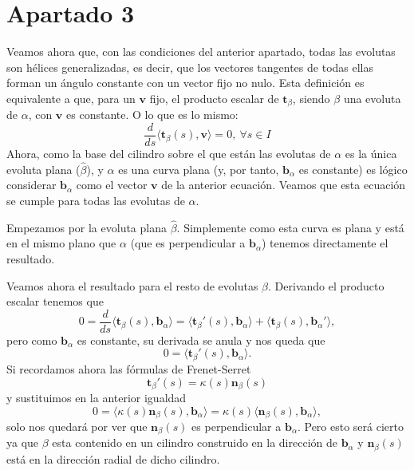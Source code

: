 \section{Apartado 3}
Veamos ahora que, con las condiciones del anterior apartado, todas las evolutas
son hélices generalizadas, es decir, que los vectores tangentes de todas ellas
forman un ángulo constante con un vector fijo no nulo. Esta definición es
equivalente a que, para un $\mathbf{v}$ fijo, el producto escalar de
$\mathbf{t}_{\beta}$, siendo $\beta$ una evoluta de $\alpha$, con $\mathbf{v}$
es constante. O lo que es lo mismo:
\[
    \frac{d}{ds}\langle \mathbf{t}_{\beta}\left( s \right), \mathbf{v} \rangle
    = 0,\ \forall s \in I
\]
Ahora, como la base del cilindro sobre el que están las evolutas de $\alpha$ es
la única evoluta plana ($\hat{\beta}$), y $\alpha$ es una curva
plana (y, por tanto, $\mathbf{b}_{\alpha}$ es constante) es lógico considerar
$\mathbf{b}_{\alpha}$ como el vector $\mathbf{v}$ de la anterior ecuación.
Veamos que esta ecuación se cumple para todas las evolutas de $\alpha$.

Empezamos por la evoluta plana $\hat{\beta}$. Simplemente como esta curva es
plana y está en el mismo plano que $\alpha$ (que es perpendicular a
$\mathbf{b}_{\alpha}$) tenemos directamente el resultado.

Veamos ahora el resultado para el resto de evolutas $\beta$. Derivando el
producto escalar tenemos que
\[
0 = \frac{d}{ds}\langle \mathbf{t}_{\beta}\left( s \right),
\mathbf{b}_{\alpha} \rangle = \langle
\mathbf{t}_{\beta}'\left( s \right), \mathbf{b}_{\alpha} \rangle
+ \langle \mathbf{t}_{\beta}\left( s \right),
\mathbf{b}_{\alpha}' \rangle,
\]
pero como $\mathbf{b}_{\alpha}$ es constante, su derivada se anula y nos queda
que
\[
0 = \langle \mathbf{t}_{\beta}'\left( s \right), \mathbf{b}_{\alpha} \rangle.
\]
Si recordamos ahora las fórmulas de Frenet-Serret
\[
\mathbf{t}_{\beta}'\left( s \right) = \kappa\left( s \right)\mathbf{n}_{\beta}\left( s \right)
\]
y sustituimos en la anterior igualdad
\[
0 = \langle \kappa\left( s \right)\mathbf{n}_{\beta}\left( s \right),
\mathbf{b}_{\alpha} \rangle = \kappa\left( s \right)\langle
\mathbf{n}_{\beta}\left( s \right), \mathbf{b}_{\alpha} \rangle,
\]
solo nos quedará por ver que $\mathbf{n}_{\beta}\left( s \right)$ es
perpendicular a $\mathbf{b}_{\alpha}$. Pero esto será cierto ya que $\beta$ esta
contenido en un cilindro construido en la dirección de $\mathbf{b}_{\alpha}$ y
$\mathbf{n}_{\beta}\left( s \right)$ está en la dirección radial de dicho
cilindro.
